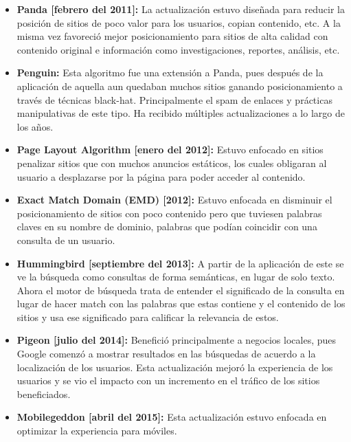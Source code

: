 \documentclass[12pt]{article}
\begin{document}
\begin{itemize}

\item \textbf{Panda [febrero del 2011]:} La actualización estuvo diseñada para reducir la posición de sitios de poco valor para los usuarios, copian contenido, etc. A la misma vez favoreció mejor posicionamiento para sitios de alta calidad con contenido original e información como investigaciones, reportes, análisis, etc. \cite{panda}

\item \textbf{Penguin:} Esta algoritmo fue una extensión a Panda, pues después de la aplicación de aquella aun quedaban muchos sitios ganando posicionamiento a través de técnicas black-hat. Principalmente el spam de enlaces y prácticas manipulativas de este tipo. Ha recibido múltiples actualizaciones a lo largo de los años. \cite{penguin}

\item \textbf{Page Layout Algorithm [enero del 2012]:} Estuvo enfocado en sitios penalizar sitios que con muchos anuncios estáticos, los cuales obligaran al usuario a desplazarse por la página para poder acceder al contenido.

\item \textbf{Exact Match Domain (EMD) [2012]:} Estuvo enfocada en disminuir el posicionamiento de sitios con poco contenido pero que tuviesen palabras claves en su nombre de dominio, palabras que podían coincidir con una consulta de un usuario.

\item \textbf{Hummingbird [septiembre del 2013]:} A partir de la aplicación de este se ve la búsqueda como consultas de forma semánticas, en lugar de solo texto. Ahora el motor de búsqueda trata de entender el significado de la consulta en lugar de hacer match con las palabras que estas contiene y el contenido de los sitios y usa ese significado para calificar la relevancia de estos.

\item \textbf{Pigeon [julio del 2014]:} Benefició principalmente a negocios locales, pues Google comenzó a mostrar resultados en las búsquedas de acuerdo a la localización de los usuarios. Esta actualización mejoró la experiencia de los usuarios y se vio el impacto con un incremento en el tráfico de los sitios beneficiados.

\item \textbf{Mobilegeddon [abril del 2015]:} Esta actualización estuvo enfocada en optimizar la experiencia para móviles. \cite{mobilgeddon}


\end{itemize}
\end{document}
